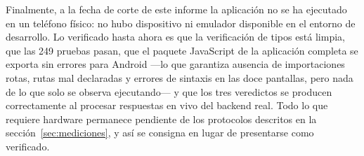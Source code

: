 Finalmente, a la fecha de corte de este informe la aplicación no se ha ejecutado en un
teléfono físico: no hubo dispositivo ni emulador disponible en el entorno de
desarrollo. Lo verificado hasta ahora es que la verificación de tipos está limpia, que
las 249 pruebas pasan, que el paquete JavaScript de la aplicación completa se exporta
sin errores para Android ---lo que garantiza ausencia de importaciones rotas, rutas mal
declaradas y errores de sintaxis en las doce pantallas, pero nada de lo que solo se
observa ejecutando--- y que los tres veredictos se producen correctamente al procesar
respuestas en vivo del backend real. Todo lo que requiere hardware permanece pendiente
de los protocolos descritos en la sección~\ref{sec:mediciones}, y así se consigna en
lugar de presentarse como verificado.
